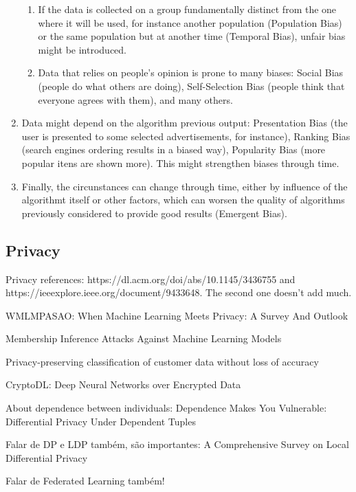 \begin{enumerate}
\begin{enumerate}
    \item If the data is collected on a group fundamentally distinct from the one where it will be used, for instance another population (Population Bias) or the same population but at another time (Temporal Bias), unfair bias might be introduced.
    \item Data that relies on people's opinion is prone to many biases: Social Bias (people do what others are doing), Self-Selection Bias (people think that everyone agrees with them), and many others.
    \end{enumerate}
\item Data might depend on the algorithm previous output: Presentation Bias (the user is presented to some selected advertisements, for instance), Ranking Bias (search engines ordering results in a biased way), Popularity Bias (more popular itens are shown more). This might strengthen biases through time. 
\item Finally, the circunstances can change through time, either by influence of the algorithmt itself or other factors, which can worsen the quality of algorithms previously considered to provide good results (Emergent Bias).
\end{enumerate}


\subsection{Privacy}

{\color{red} Privacy references: https://dl.acm.org/doi/abs/10.1145/3436755 and https://ieeexplore.ieee.org/document/9433648. The second one doesn't add much.

 WMLMPASAO: When Machine Learning Meets Privacy: A Survey And Outlook


Membership Inference Attacks Against Machine Learning Models

Privacy-preserving classification of customer data without loss of accuracy

CryptoDL: Deep Neural Networks over Encrypted Data

About dependence between individuals: Dependence Makes You Vulnerable: Differential Privacy Under Dependent Tuples


}

{\color{red} Falar de DP e LDP também, são importantes: A Comprehensive Survey on Local Differential Privacy}

{\color{red} Falar de Federated Learning também!}

